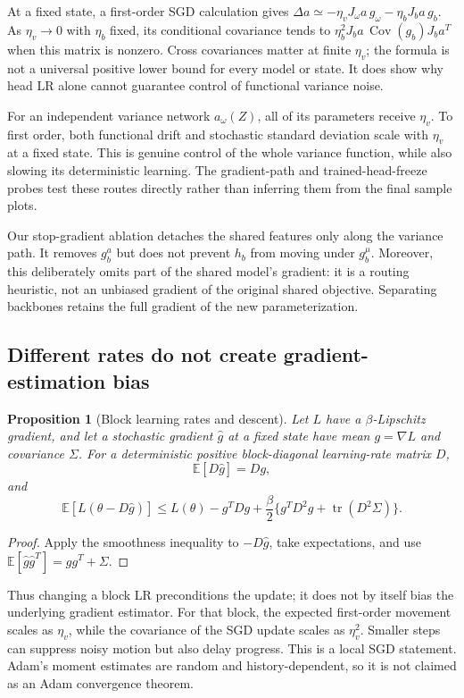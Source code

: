 \documentclass[11pt,a4paper]{article}
\newtheorem{proposition}{Proposition}[section]
\newcommand{\E}{\mathbb E}
\newcommand{\Cov}{\operatorname{Cov}}
\newcommand{\tr}{\operatorname{tr}}
\begin{document}
At a fixed state, a first-order SGD calculation gives
$\Delta a\simeq-\eta_v J_\omega a\,g_\omega-\eta_bJ_b a\,g_b$.
As $\eta_v\to0$ with $\eta_b$ fixed, its conditional covariance tends to
$\eta_b^2J_b a\,\Cov(g_b)J_b a^T$ when this matrix is nonzero. Cross
covariances matter at finite $\eta_v$; the formula is not a universal positive
lower bound for every model or state. It does show why head LR alone cannot
guarantee control of functional variance noise.

For an independent variance network $a_\omega(Z)$, all of its parameters
receive $\eta_v$. To first order, both functional drift and stochastic
standard deviation scale with $\eta_v$ at a fixed state. This is genuine
control of the whole variance function, while also slowing its deterministic
learning. The gradient-path and trained-head-freeze probes test these routes
directly rather than inferring them from the final sample plots.

Our stop-gradient ablation detaches the shared features only along the
variance path. It removes $g_b^a$ but does not prevent $h_b$ from moving under
$g_b^\mu$. Moreover, this deliberately omits part of the shared model's
gradient: it is a routing heuristic, not an unbiased gradient of the original
shared objective. Separating backbones retains the full gradient of the new
parameterization.

\subsection{Different rates do not create gradient-estimation bias}
\begin{proposition}[Block learning rates and descent]
Let $L$ have a $\beta$-Lipschitz gradient, and let a stochastic gradient
$\widehat g$ at a fixed state have mean $g=\nabla L$ and covariance $\Sigma$.
For a deterministic positive block-diagonal learning-rate matrix $D$,
\[
 \E[D\widehat g]=Dg,
\]
and
\begin{equation}
 \E[L(\theta-D\widehat g)]\le L(\theta)-g^TDg
 +\frac\beta2\{g^TD^2g+\tr(D^2\Sigma)\}.
 \label{eq:descent}
\end{equation}
\end{proposition}
\begin{proof}
Apply the smoothness inequality to $-D\widehat g$, take expectations, and use
$\E[\widehat g\widehat g^T]=gg^T+\Sigma$.
\end{proof}

Thus changing a block LR preconditions the update; it does not by itself bias
the underlying gradient estimator. For that block, the expected first-order
movement scales as $\eta_v$, while the covariance of the SGD update scales as
$\eta_v^2$. Smaller steps can suppress noisy motion but also delay progress.
This is a local SGD statement. Adam's moment estimates are random and
history-dependent, so it is not claimed as an Adam convergence theorem.
\end{document}

